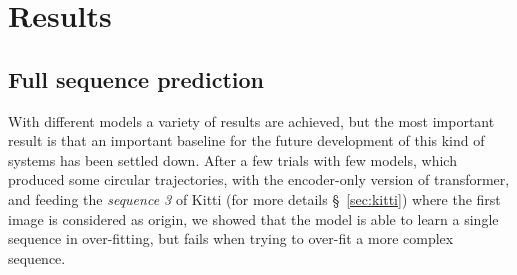 \section{Results}\label{sec:results}


\subsection{Full sequence prediction}\label{subsec:full-sequence-prediction}
With different models a variety of results are achieved, but the most important result is that an important baseline for the future development of this kind of systems has been settled down.
After a few trials with few models, which produced some circular trajectories, with the encoder-only version of transformer, and feeding the \textit{sequence 3} of Kitti (for more details \S~\ref{sec:kitti}) where the first image is considered as origin, we showed that the model is able to learn a single sequence in over-fitting, but fails when trying to over-fit a more complex sequence.

